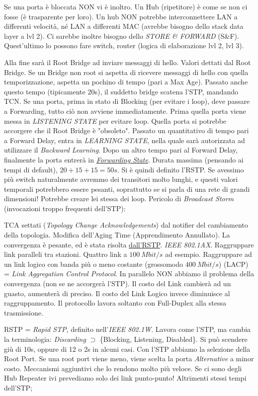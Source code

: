 Se una porta è bloccata NON vi è inoltro. Un Hub (ripetitore) è come se non ci fosse (è trasparente per loro). Un hub NON potrebbe interconnettere LAN a differenti velocità, né LAN a differenti MAC (avrebbe bisogno dello stack data layer a lvl 2). Ci sarebbe inoltre bisogno dello \textit{STORE \& FORWARD} (S\&F). Quest'ultimo lo possono fare switch, router (logica di elaborazione lvl 2, lvl 3).

Alla fine sarà il Root Bridge ad inviare messaggi di hello. Valori dettati dal Root Bridge. Se un Bridge non root si aspetta di ricevere messaggi di hello con quella temporizzazione, aspetta un pochino di tempo (pari a Max Age). Passato anche questo tempo (tipicamente 20s), il suddetto bridge scatena l'STP, mandando TCN. Se una porta, prima in stato di Blocking (per evitare i loop), deve passare a Forwarding, tutto ciò non avviene immediatamente. Prima quella porta viene messa in \textit{LISTENING STATE} per evitare loop. Quella porta si potrebbe accorgere che il Root Bridge è "obsoleto". Passato un quantitativo di tempo pari a Forward Delay, entra in \textit{LEARNING STATE}, nella quale sarà autorizzata ad utilizzare il \textit{Backward Learning}. Dopo un altro tempo pari al Forward Delay, finalmente la porta entrerà in \underline{\textit{Forwarding State}}. Durata massima (pensando ai tempi di default), $20+15+15=50s$. Si è quindi definito l'RSTP. Se avessimo più switch naturalmente avremmo dei transitori molto lunghi, e questi valori temporali potrebbero essere pesanti, soprattutto se si parla di una rete di grandi dimensioni! Potrebbe creare lei stessa dei loop. Pericolo di \textit{Broadcast Storm} (invocazioni troppo frequenti dell'STP):

TCA settati (\textit{Topology Change Acknowledgements}) dal notifier del cambiamento della topologia. Modifica dell'Aging Time (Apprendimento Annullato). La convergenza è pesante, ed è stata risolta \underline{dall'RSTP}. \textit{IEEE 802.1AX}. Raggruppare link paralleli tra stazioni. Quattro link a $100\ Mbit/s$ ad esempio. Raggruppare ad un link logico con banda più o meno costante (grossomodo $400\ Mbit/s$) (LACP) = \textit{Link Aggregation Control Protocol}. In parallelo NON abbiamo il problema della convergenza (non se ne accorgerà l'STP). Il costo del Link cambierà ad un guasto, aumenterà di preciso. Il costo del Link Logico invece diminuisce al raggruppamento. Il protocollo lavora soltanto con Full-Duplex alla stessa trasmissione.

RSTP = \textit{Rapid STP}, definito nell'\textit{IEEE 802.1W}. Lavora come l'STP, ma cambia la terminologia: \textit{Discarding} $\supset$ \{Blocking, Listening, Disabled\}. Si può scendere giù di 10s, oppure di 12 o 2s in alcuni casi. Con l'STP abbiamo la selezione della Root Port. Se una root port viene meno, viene scelta la porta \textit{Alternative} a minor costo. Meccanismi aggiuntivi che lo rendono molto più veloce. Se ci sono degli Hub Repeater ivi prevediamo solo dei link punto-punto! Altrimenti stessi tempi dell'STP;

